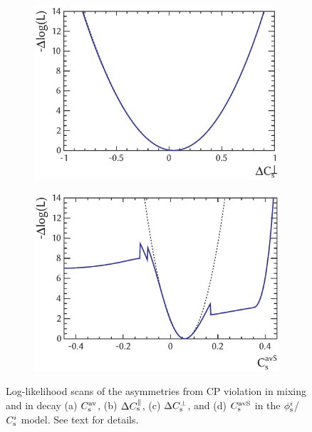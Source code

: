 \begin{figure}[tbp]
  \vspace*{0.02\textwidth}
  \begin{subfigure}{0.49\textwidth}
    \includegraphics[width=\textwidth]{graphics/results/NLL_polarDep_CCPRel_Aperp}
    \caption{}
  \end{subfigure}
  \hfill%
  \begin{subfigure}{0.49\textwidth}
    \includegraphics[width=\textwidth]{graphics/results/NLL_polarDep_CCPAv_AS}
    \caption{}
  \end{subfigure}

  \caption{Log-likelihood scans of the asymmetries from CP violation in mixing and in decay
           (a) $C_\text{s}^\text{av}$, (b) $\Delta C_\text{s}^\parallel$, (c) $\Delta C_\text{s}^\perp$, and (d) $C_\text{s}^\text{avS}$ in the $\phi_\text{s}^{i}$/$C_\text{s}^{i}$ model. 
           See text for details.}
  \label{fig:NLL_CPV_mixDecay}
\end{figure}

